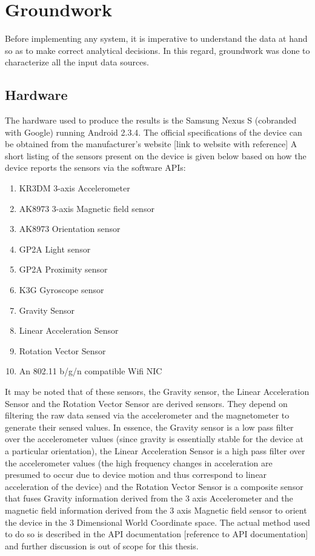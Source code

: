 \chapter{Groundwork\label{chap:groundwork}}


Before implementing any system, it is imperative to understand the data at hand
so as to make correct analytical decisions. In this regard, groundwork was done
to characterize all the input data sources.

\section{Hardware}
The hardware used to produce the results is the Samsung Nexus S (cobranded with
Google) running Android 2.3.4. The official specifications of the device can be
obtained from the manufacturer's website [link to website with reference] A
short listing of the sensors present on the device is given below based on how
the device reports the sensors via the software APIs:

\begin{enumerate}
\item KR3DM 3-axis Accelerometer
\item AK8973 3-axis Magnetic field sensor
\item AK8973 Orientation sensor
\item GP2A Light sensor
\item GP2A Proximity sensor
\item K3G Gyroscope sensor
\item Gravity Sensor
\item Linear Acceleration Sensor
\item Rotation Vector Sensor
\item An 802.11 b/g/n compatible Wifi NIC
\end{enumerate}

It may be noted that of these sensors, the Gravity sensor, the Linear
Acceleration Sensor and the Rotation Vector Sensor are derived sensors. They
depend on filtering the raw data sensed via the accelerometer and the
magnetometer to generate their sensed values. In essence, the Gravity sensor is
a low pass filter over the accelerometer values (since gravity is essentially
stable for the device at a particular orientation), the Linear Acceleration
Sensor is a high pass filter over the accelerometer values (the high frequency
changes in acceleration are presumed to occur due to device motion and thus
correspond to linear acceleration of the device) and the Rotation Vector Sensor
is a composite sensor that fuses Gravity information derived from the
3 axis Accelerometer and the magnetic field information derived from the
3 axis Magnetic field sensor to orient the device in the 3 Dimensional World 
Coordinate space. The actual method used to do so is described in the API
documentation [reference to API documentation] and
further discussion is out of scope for this thesis.

